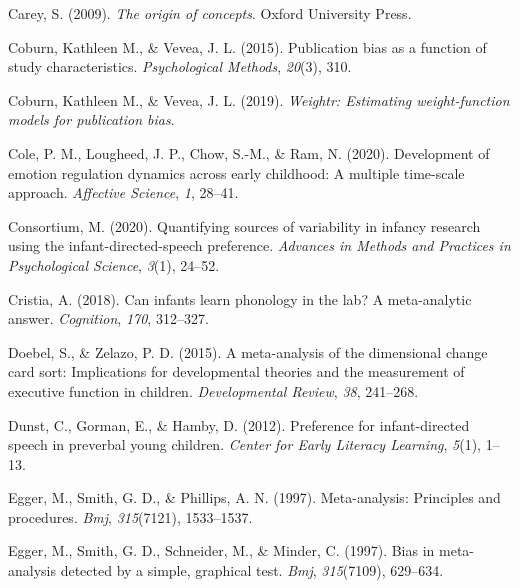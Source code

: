 \documentclass[
  man]{apa6}
\newlength{\cslhangindent}
\newlength{\cslentryspacingunit} %
\newenvironment{CSLReferences}[2] %
 {%
  \setlength{\parindent}{0pt}
  \ifodd #1
  \let\oldpar\par
  \def\par{\hangindent=\cslhangindent\oldpar}
  \fi
  \setlength{\parskip}{#2\cslentryspacingunit}
 }%
 {}
\begin{document}
\begin{CSLReferences}{1}{0}
\leavevmode{}%
Carey, S. (2009). \emph{The origin of concepts}. Oxford University Press.

\leavevmode{}%
Coburn, Kathleen M., \& Vevea, J. L. (2015). Publication bias as a function of study characteristics. \emph{Psychological Methods}, \emph{20}(3), 310.

\leavevmode{}%
Coburn, Kathleen M., \& Vevea, J. L. (2019). \emph{Weightr: Estimating weight-function models for publication bias}.

\leavevmode{}%
Cole, P. M., Lougheed, J. P., Chow, S.-M., \& Ram, N. (2020). Development of emotion regulation dynamics across early childhood: A multiple time-scale approach. \emph{Affective Science}, \emph{1}, 28--41.

\leavevmode{}%
Consortium, M. (2020). Quantifying sources of variability in infancy research using the infant-directed-speech preference. \emph{Advances in Methods and Practices in Psychological Science}, \emph{3}(1), 24--52.

\leavevmode{}%
Cristia, A. (2018). Can infants learn phonology in the lab? A meta-analytic answer. \emph{Cognition}, \emph{170}, 312--327.

\leavevmode{}%
Doebel, S., \& Zelazo, P. D. (2015). A meta-analysis of the dimensional change card sort: Implications for developmental theories and the measurement of executive function in children. \emph{Developmental Review}, \emph{38}, 241--268.

\leavevmode{}%
Dunst, C., Gorman, E., \& Hamby, D. (2012). Preference for infant-directed speech in preverbal young children. \emph{Center for Early Literacy Learning}, \emph{5}(1), 1--13.

\leavevmode{}%
Egger, M., Smith, G. D., \& Phillips, A. N. (1997). Meta-analysis: Principles and procedures. \emph{Bmj}, \emph{315}(7121), 1533--1537.

\leavevmode{}%
Egger, M., Smith, G. D., Schneider, M., \& Minder, C. (1997). Bias in meta-analysis detected by a simple, graphical test. \emph{Bmj}, \emph{315}(7109), 629--634.


\end{CSLReferences}
\end{document}
